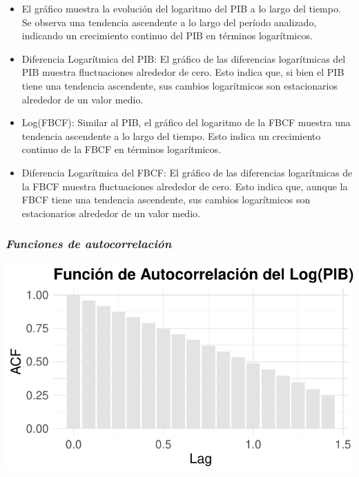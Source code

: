 \documentclass[
  12pt,
]{article}
\begin{document}
\begin{itemize}
\item
  El gráfico muestra la evolución del logaritmo del PIB a lo largo del
  tiempo. Se observa una tendencia ascendente a lo largo del período
  analizado, indicando un crecimiento continuo del PIB en términos
  logarítmicos.
\item
  Diferencia Logarítmica del PIB: El gráfico de las diferencias
  logarítmicas del PIB muestra fluctuaciones alrededor de cero. Esto
  indica que, si bien el PIB tiene una tendencia ascendente, sus cambios
  logarítmicos son estacionarios alrededor de un valor medio.
\item
  Log(FBCF): Similar al PIB, el gráfico del logaritmo de la FBCF muestra
  una tendencia ascendente a lo largo del tiempo. Esto indica un
  crecimiento continuo de la FBCF en términos logarítmicos.
\item
  Diferencia Logarítmica del FBCF: El gráfico de las diferencias
  logarítmicas de la FBCF muestra fluctuaciones alrededor de cero. Esto
  indica que, aunque la FBCF tiene una tendencia ascendente, sus cambios
  logarítmicos son estacionarios alrededor de un valor medio.
\end{itemize}

\subsubsection{\texorpdfstring{\emph{Funciones de
autocorrelación}}{Funciones de autocorrelación}}\label{funciones-de-autocorrelaciuxf3n}

\begin{center}\includegraphics{ensayo_files/figure-latex/unnamed-chunk-12-1} \end{center}
\end{document}
